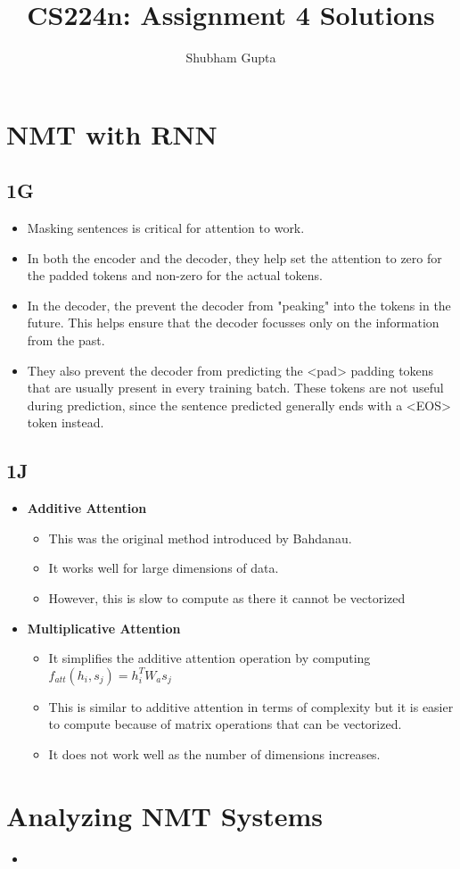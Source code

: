 \documentclass[a4paper]{article}
\title{CS224n: Assignment 4 Solutions}
\author{Shubham Gupta}
\begin{document}
\maketitle
\section{NMT with RNN}
\subsection{1G}
\begin{itemize}
    \item Masking sentences is critical for attention to work.
    \item In both the encoder and the decoder, they help set the attention to zero for the padded tokens and non-zero for the actual tokens.
    \item In the decoder, the prevent the decoder from "peaking" into the tokens in the future. This helps ensure that the decoder focusses only on the information from the past.
    \item They also prevent the decoder from predicting the <pad> padding tokens that are usually present in every training batch. These tokens are not useful during prediction, since the sentence predicted generally ends with a <EOS> token instead. 
\end{itemize}
\subsection{1J}
\begin{itemize}
    \item \textbf{Additive Attention} 
        \begin{itemize}
            \item This was the original method introduced by Bahdanau.
            \item It works well for large dimensions of data.
            \item However, this is slow to compute as there it cannot be vectorized
        \end{itemize}
    \item \textbf{Multiplicative Attention} 
        \begin{itemize}
            \item It simplifies the additive attention operation by computing
                $f_{att}(h_i, s_j) = h_i^TW_as_j$
            \item This is similar to additive attention in terms of complexity but it is easier to compute because of matrix operations that can be vectorized.
            \item It does not work well as the number of dimensions increases.
        \end{itemize}
\end{itemize}
\section{Analyzing NMT Systems}
\begin{itemize}
    \item 
\end{itemize}
\end{document}
